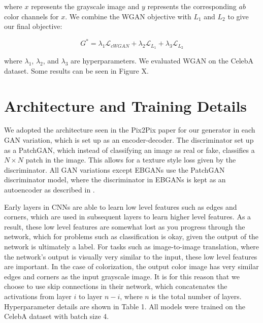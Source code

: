 \documentclass[10pt]{article}
\begin{document}
\noindent where $x$ represents the grayscale image and $y$ represents the corresponding
$ab$ color channels for $x$. We combine the WGAN objective with $L_1$ and $L_2$ to give our final objective:

\[ G^* = \lambda_1 \mathcal{L}_{cWGAN} + \lambda_2 \mathcal{L}_{L_1} + \lambda_3 \mathcal{L}_{L_2} \]

\noindent where $\lambda_1$, $\lambda_2$, and $\lambda_3$ are hyperparameters. We evaluated WGAN on
the CelebA dataset. Some results can be seen in Figure X. 

\section{Architecture and Training Details}
We adopted the architecture seen in the Pix2Pix paper \cite{isola2016image} for our generator in each GAN variation, which is set up as an encoder-decoder. The 
discriminator set up as a PatchGAN, which instead of classifying an image as real or fake, classifies a $N \times N$ patch in the image. This allows for a texture style loss given
by the discriminator. All GAN variations except EBGANs use the PatchGAN discriminator model, where the discriminator in EBGANs is kept as an autoencoder as described in \cite{zhao2016energy}.

Early layers in CNNs are able to learn low level features such as edges and corners, which are used in subsequent layers to learn higher level features. As a result, these low level features are
somewhat lost as you progress through the network, which for problems such as classification is okay, given the output of the network is ultimately a label. For tasks such as
image-to-image translation, where the network's output is visually very similar to the input, these low level features are important. In the case of colorization, the
output color image has very similar edges and corners as the input grayscale image. It is for this reason that we choose to use skip connections in their network, which concatenates the
activations from layer $i$ to layer $n-i$, where $n$ is the total number of layers. Hyperparameter details are shown in Table 1. All models were trained on the CelebA dataset with batch size 4.
\end{document}

